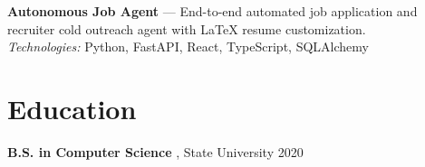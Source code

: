 \documentclass[11pt,a4paper]{article}
\begin{document}
\noindent \textbf{ Autonomous Job Agent } --- End-to-end automated job application and recruiter cold outreach agent with LaTeX resume customization. \\
\textit{Technologies:} Python, FastAPI, React, TypeScript, SQLAlchemy
\vspace{2pt}


\section*{Education}

\noindent \textbf{ B.S. in Computer Science }, State University \hfill 2020 \\
\end{document}

